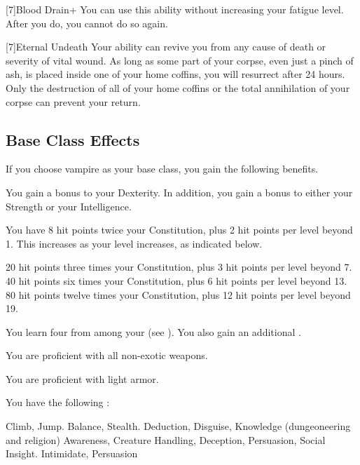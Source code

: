     [7]{Blood Drain+} You can use this ability without increasing your fatigue level.
    After you do, you  cannot do so again.

    [7]{Eternal Undeath} Your  ability can revive you from any cause of death or severity of vital wound.
      As long as some part of your corpse, even just a pinch of ash, is placed inside one of your home coffins, you will resurrect after 24 hours.
      Only the destruction of all of your home coffins or the total annihilation of your corpse can prevent your return.

  \subsection{Base Class Effects}
    If you choose vampire as your base class, you gain the following benefits.

      You gain a  bonus to your Dexterity. In addition, you gain a  bonus to either your Strength or your Intelligence.

      You have 8 hit points \add twice your Constitution, plus 2 hit points per level beyond 1.
      This increases as your level increases, as indicated below.
      \begin{itemize}
         20 hit points \add three times your Constitution, plus 3 hit points per level beyond 7.
         40 hit points \add six times your Constitution, plus 6 hit points per level beyond 13.
         80 hit points \add twelve times your Constitution, plus 12 hit points per level beyond 19.
      \end{itemize}

      You learn four  from among your  (see ).
      You also gain an additional .

      You are proficient with all non-exotic weapons.

      You are proficient with light armor.

      You have the following :
      \begin{itemize}
         Climb, Jump.
         Balance, Stealth.
         Deduction, Disguise, Knowledge (dungeoneering and religion)
         Awareness, Creature Handling, Deception, Persuasion, Social Insight.
         Intimidate, Persuasion
      \end{itemize}
